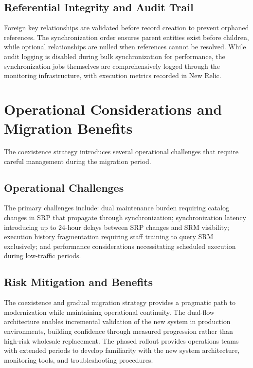 \subsection{Referential Integrity and Audit Trail}

Foreign key relationships are validated before record creation to prevent orphaned references. The synchronization order ensures parent entities exist before children, while optional relationships are nulled when references cannot be resolved. While audit logging is disabled during bulk synchronization for performance, the synchronization jobs themselves are comprehensively logged through the monitoring infrastructure, with execution metrics recorded in New Relic.

\section{Operational Considerations and Migration Benefits}

The coexistence strategy introduces several operational challenges that require careful management during the migration period.

\subsection{Operational Challenges}

The primary challenges include: dual maintenance burden requiring catalog changes in SRP that propagate through synchronization; synchronization latency introducing up to 24-hour delays between SRP changes and SRM visibility; execution history fragmentation requiring staff training to query SRM exclusively; and performance considerations necessitating scheduled execution during low-traffic periods.

\subsection{Risk Mitigation and Benefits}

The coexistence and gradual migration strategy provides a pragmatic path to modernization while maintaining operational continuity. The dual-flow architecture enables incremental validation of the new system in production environments, building confidence through measured progression rather than high-risk wholesale replacement. The phased rollout provides operations teams with extended periods to develop familiarity with the new system architecture, monitoring tools, and troubleshooting procedures.

